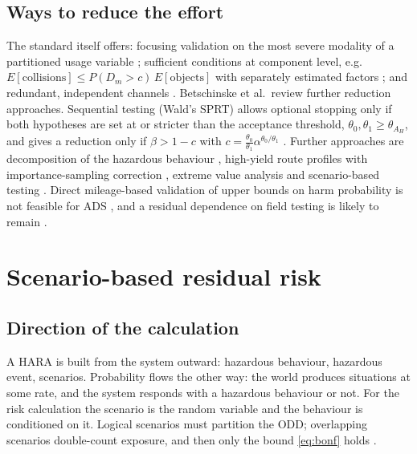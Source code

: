 \documentclass[11pt,a4paper]{article}
\begin{document}
\subsection{Ways to reduce the effort}
The standard itself offers: focusing validation on the most severe modality of a partitioned usage variable \cite[C.6.1, p.~153]{iso21448}; sufficient conditions at component level, e.g.\ $E[\text{collisions}]\le P(D_m>c)\,E[\text{objects}]$ with separately estimated factors \cite[C.6.2, p.~153; C.6.3.2, pp.~154--156]{iso21448}; and redundant, independent channels \cite[C.6.3.3, pp.~156--158]{iso21448}. Betschinske et al.\ review further reduction approaches. Sequential testing (Wald's SPRT) allows optional stopping only if both hypotheses are set at or stricter than the acceptance threshold, $\theta_0,\theta_1\ge\theta_{A_H}$, and gives a reduction only if $\beta>1-c$ with $c=\tfrac{\theta_0}{\theta_1}\alpha^{\theta_0/\theta_1}$ \cite[Sec.~V, RA ``Sequential Testing'', Eqs.~(14)--(15)]{betschinske2025}. Further approaches are decomposition of the hazardous behaviour \cite[Sec.~V, Eqs.~(8)--(9)]{betschinske2025}, high-yield route profiles with importance-sampling correction \cite[Sec.~V, RA ``High Yield Route Profiles'', Fig.~12]{betschinske2025}, extreme value analysis \cite[Sec.~V, RA ``Extreme Value Analysis'', Table~IX]{betschinske2025} and scenario-based testing \cite[Sec.~V, RA ``Scenario Based Testing'', Table~XI]{betschinske2025}. Direct mileage-based validation of upper bounds on harm probability is not feasible for ADS \cite[Sec.~IV-A(b), citing Wachenfeld and Winner]{putze2023}, and a residual dependence on field testing is likely to remain \cite[Sec.~VII]{betschinske2025}.

\section{Scenario-based residual risk}\label{sec:scenario}
\subsection{Direction of the calculation}
A HARA is built from the system outward: hazardous behaviour, hazardous event, scenarios. Probability flows the other way: the world produces situations at some rate, and the system responds with a hazardous behaviour or not. For the risk calculation the scenario is the random variable and the behaviour is conditioned on it. Logical scenarios must partition the ODD; overlapping scenarios double-count exposure, and then only the bound \eqref{eq:bonf} holds \cite[Sec.~IV-B(b), Eq.~(2)]{putze2023}.
\end{document}
